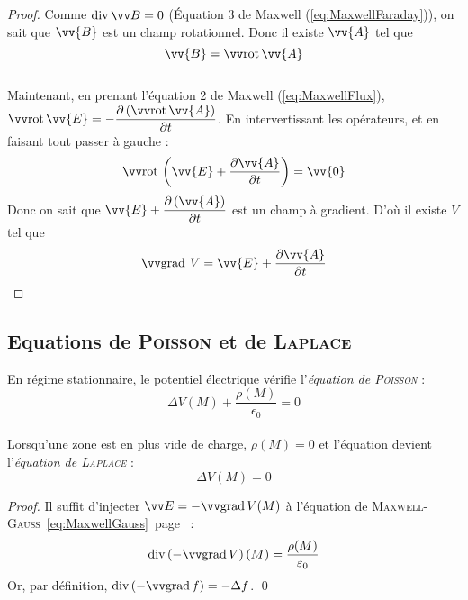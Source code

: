 \documentclass[11pt,a4paper,fleqn,pdftex]{report}
\begin{document}
\begin{proof}
Comme $\diverg \B{} = 0$ (Équation 3 de Maxwell (\ref{eq:MaxwellFaraday})), on sait que $\vv{B}$ est un champ rotationnel. Donc il existe $\vv{A}$ tel que $$\vv{B} = \rot \vv{A}$$\\
Maintenant, en prenant l'équation 2 de Maxwell (\ref{eq:MaxwellFlux}), $\rot \vv{E}=-\dfrac{\partial \left( \rot \vv{A} \right)}{\partial t}$. En intervertissant les opérateurs, et en faisant tout passer à gauche : $$\rot \left( \vv{E} + \dfrac{\partial \vv{A}}{\partial t} \right)=\vv{0}$$ Donc on sait que $\vv{E} + \dfrac{\partial \left( \vv{A} \right)}{\partial t}$ est un champ à gradient. D'où il existe $V$ tel que $$\grad \: V = \vv{E} + \dfrac{\partial \vv{A}}{\partial t}$$
\end{proof}
\subsection{Equations de \textsc{Poisson} et de \textsc{Laplace}}
\needspace{7cm}
\begin{itheorem}
   En régime stationnaire, le potentiel électrique vérifie l'\emph{équation de \textsc{Poisson}} :
   \begin{equation}
   \Delta V(M) + \dfrac{\rho (M)}{\epsilon_0} = 0
   \end{equation}
   \\
   Lorsqu'une zone est en plus vide de charge, $\rho (M) =0$ et l'équation devient l'\emph{équation de \textsc{Laplace}} : 
   \begin{equation}
   \Delta V(M) = 0
   \end{equation}
   
\end{itheorem}
\begin{proof}
   Il suffit d'injecter $\E = -\grad V (M)$ à l'équation de \textsc{Maxwell}-\textsc{Gauss}~\eqref{eq:MaxwellGauss}~page~\pageref{eq:MaxwellGauss} : 
   \begin{equation}
   \diverg[-\grad V](M) = \dfrac{\rho (M)}{\epsilon_0}
   \end{equation}
   Or, par définition, $\diverg[-\grad f] = -\Delta f$. \qed
\end{proof}
\end{document}

